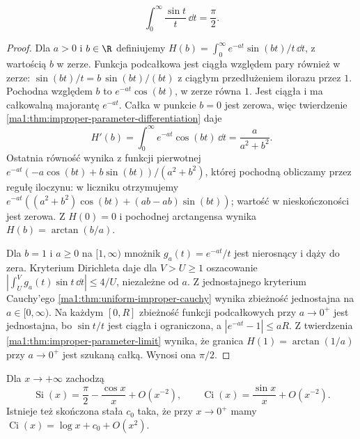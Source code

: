 \begin{twierdzenie}
\label{ma1:thm:sine-integral-value}
\[
 \int_0^\infty\frac{\sin t}{t}\,\dd t=\frac{\pi}{2}.
\]
\end{twierdzenie}
\begin{proof}
Dla $a>0$ i $b\in\R$ definiujemy
$H(b)=\int_0^\infty e^{-at}\sin(bt)/t\,\dd t$, z wartością $b$ w zerze. Funkcja podcałkowa jest ciągła względem pary również w zerze: $\sin(bt)/t=b\,\sin(bt)/(bt)$ z ciągłym przedłużeniem ilorazu przez $1$. Pochodna względem $b$ to $e^{-at}\cos(bt)$, w zerze równa $1$. Jest ciągła i ma całkowalną majorantę $e^{-at}$. Całka w punkcie $b=0$ jest zerowa, więc twierdzenie \ref{ma1:thm:improper-parameter-differentiation} daje
\[
 H'(b)=\int_0^\infty e^{-at}\cos(bt)\,\dd t=\frac{a}{a^2+b^2}.
\]
Ostatnia równość wynika z funkcji pierwotnej
$e^{-at}(-a\cos(bt)+b\sin(bt))/(a^2+b^2)$, której pochodną obliczamy przez regułę iloczynu: w liczniku otrzymujemy $e^{-at}((a^2+b^2)\cos(bt)+(ab-ab)\sin(bt))$; wartość w nieskończoności jest zerowa. Z $H(0)=0$ i pochodnej arctangensa wynika $H(b)=\arctan(b/a)$.

Dla $b=1$ i $a\ge0$ na $[1,\infty)$ mnożnik $g_a(t)=e^{-at}/t$ jest nierosnący i dąży do zera. Kryterium Dirichleta daje dla $V>U\ge1$ oszacowanie $|\int_U^V g_a(t)\sin t\,\dd t|\le4/U$, niezależne od $a$. Z jednostajnego kryterium Cauchy'ego \ref{ma1:thm:uniform-improper-cauchy} wynika zbieżność jednostajna na $a\in[0,\infty)$. Na każdym $[0,R]$ zbieżność funkcji podcałkowych przy $a\to0^+$ jest jednostajna, bo $\sin t/t$ jest ciągła i ograniczona, a $|e^{-at}-1|\le aR$. Z twierdzenia \ref{ma1:thm:improper-parameter-limit} wynika, że granica $H(1)=\arctan(1/a)$ przy $a\to0^+$ jest szukaną całką. Wynosi ona $\pi/2$.
\end{proof}
\begin{twierdzenie}
\label{ma1:thm:si-ci-asymptotics}
Dla $x\to+\infty$ zachodzą
\[
 \operatorname{Si}(x)=\frac\pi2-\frac{\cos x}{x}+O(x^{-2}),
 \qquad \operatorname{Ci}(x)=\frac{\sin x}{x}+O(x^{-2}).
\]
Istnieje też skończona stała $c_0$ taka, że przy $x\to0^+$ mamy $\operatorname{Ci}(x)=\log x+c_0+O(x^2)$.
\end{twierdzenie}
